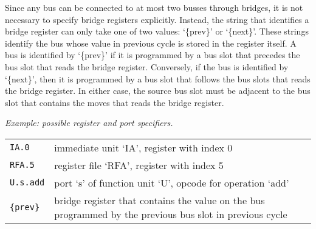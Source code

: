 \documentclass[twoside]{tceusermanual}
\begin{document}
Since any bus can be connected to at most two busses through bridges, it is
not necessary to specify bridge registers explicitly.  Instead, the string
that identifies a bridge register can only take one of two values:
`\{prev\}' or `\{next\}'.  These strings identify the bus whose value in
previous cycle is stored in the register itself.  A bus is identified by
`\{prev\}' if it is programmed by a bus slot that precedes the bus slot that
reads the bridge register.  Conversely, if the bus is identified by
`\{next\}', then it is programmed by a bus slot that follows the bus slots
that reads the bridge register.  In either case, the source bus slot must be
adjacent to the bus slot that contains the moves that reads the bridge
register.

\emph{Example: possible register and port specifiers.}


\begin{tabular}{lp{}}
\texttt{IA.0}    & immediate unit `IA', register with index 0\\
\texttt{RFA.5}   & register file `RFA', register with index 5\\
\texttt{U.s.add} & port `s' of function unit `U', opcode for operation
`add'\\
\verb|{|\texttt{prev}\verb|}|  & bridge register that contains the value on
the
                   bus programmed by the previous bus slot in previous
cycle\\
\end{tabular}
\end{document}
